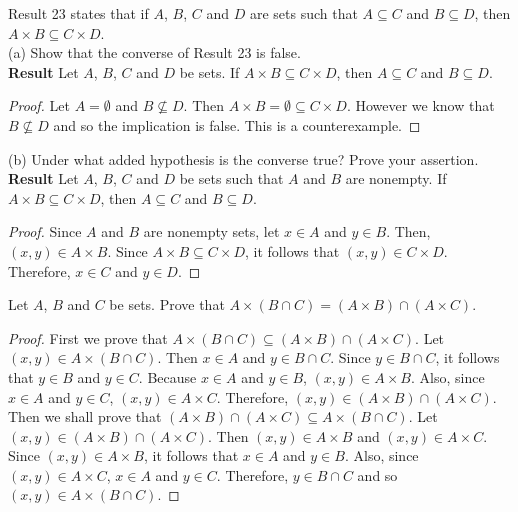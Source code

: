 \documentclass[12pt]{article}
\newenvironment{problem}[2][Problem]{\begin{trivlist}
		\item[\hskip \labelsep {\bfseries #1}\hskip \labelsep {\bfseries #2.}]}{\end{trivlist}}
\begin{document}
	\begin{problem}{66}
		Result 23 states that if $A$, $B$, $C$ and $D$ are sets such that $A\subseteq C$ and $B\subseteq D$, then $A\times B \subseteq C\times D$.\\
	
		(a) Show that the converse of Result 23 is false.\\
		
		\textbf{Result} Let $A$, $B$, $C$ and $D$ be sets. If $A\times B \subseteq C\times D$, then  $A\subseteq C$ and $B\subseteq D$. 
		\begin{proof}
			Let $A= \emptyset$ and $B\not\subseteq D$. Then $A\times B = \emptyset \subseteq C\times D$. However we know that $B\not\subseteq D$ and so the implication is false. This is a counterexample.
		\end{proof}
	
		(b) Under what added hypothesis is the converse true? Prove your assertion.\\
		
		\textbf{Result} Let $A$, $B$, $C$ and $D$ be sets such that $A$ and $B$ are nonempty. If $A\times B \subseteq C\times D$, then  $A\subseteq C$ and $B\subseteq D$. 
		\begin{proof}
			Since $A$ and $B$ are nonempty sets, let $x\in A$ and $y\in B$. Then, $(x,y) \in A\times B$. Since $A\times B \subseteq C\times D$, it follows that $(x,y)\in C\times D$. Therefore, $x\in C$ and $y\in D$. 
		\end{proof}
		
	\end{problem}

	\begin{problem}{67}
		Let $A$, $B$ and $C$ be sets. Prove that $A\times (B\cap C) = (A\times B)\cap (A\times C)$.
		\begin{proof}
			First we prove that $A\times (B\cap C) \subseteq (A\times B)\cap (A\times C)$. Let $(x,y) \in A\times (B\cap C)$. Then $x\in A$ and $y\in B\cap C$. Since $y\in B\cap C$, it follows that $y\in B$ and $y\in C$. Because $x\in A$ and $y\in B$, $(x,y)\in A\times B$. Also, since $x\in A$ and $y\in C$, $(x,y)\in A\times C$. Therefore, $(x,y)\in (A\times B)\cap (A\times C)$.\\
			Then we shall prove that $(A\times B)\cap (A\times C)\subseteq A\times (B\cap C)$. Let $(x,y)\in (A\times B)\cap (A\times C)$. Then $(x,y)\in A\times B$ and  $(x,y)\in A\times C$. Since $(x,y)\in A\times B$, it follows that $x\in A$ and $y\in B$. Also, since $(x,y)\in A\times C$, $x\in A$ and $y\in C$. Therefore, $y\in B\cap C$ and so $(x,y) \in A\times (B\cap C)$.
		\end{proof}
	\end{problem}
\end{document}
